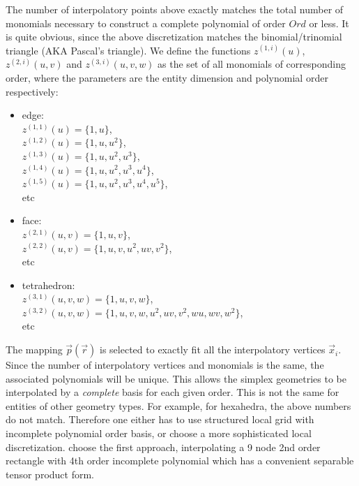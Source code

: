 \noindent
The number of interpolatory points above exactly matches the total number of monomials necessary to construct a complete polynomial of order $Ord$ or less. It is quite obvious, since the above discretization matches the binomial/trinomial triangle (AKA Pascal's triangle). We define the functions $z^{(1,i)}(u)$, $z^{(2,i)}(u,v)$ and $z^{(3,i)}(u,v,w)$ as the set of all monomials of corresponding order, where the parameters are the entity dimension and polynomial order respectively:
\begin{itemize}
	\item edge: \\
		$z^{(1,1)}(u) = \{1, u\}$, \\
		$z^{(1,2)}(u) = \{1, u, u^2\}$, \\
		$z^{(1,3)}(u) = \{1, u, u^2, u^3\}$, \\
		$z^{(1,4)}(u) = \{1, u, u^2, u^3, u^4\}$, \\
		$z^{(1,5)}(u) = \{1, u, u^2, u^3, u^4, u^5\}$, \\
		etc
	\item face:	\\
		$z^{(2,1)}(u,v)	= \{1, u, v\}$, \\
		$z^{(2,2)}(u,v) = \{1, u, v, u^2, uv, v^2\}$, \\
		etc
	\item tetrahedron: \\
		$z^{(3,1)}(u,v,w) = \{1, u, v, w\}$, \\ 
		$z^{(3,2)}(u,v,w) = \{1, u, v, w, u^2, uv, v^2, wu, wv, w^2\}$, \\
		etc
\end{itemize}

\noindent
The mapping $\vec{p}(\vec{r})$ is selected to exactly fit all the interpolatory vertices $\vec{x}_i$. Since the number of interpolatory vertices and monomials is the same, the associated polynomials will be unique. This allows the simplex geometries to be interpolated by a \textit{complete} basis for each given order. This is not the same for entities of other geometry types. For example, for hexahedra, the above numbers do not match. Therefore one either has to use structured local grid with incomplete polynomial order basis, or choose a more sophisticated local discretization. \citeauthor{volakis+2006} choose the first approach, interpolating a 9 node 2nd order rectangle with 4th order incomplete polynomial which has a convenient separable tensor product form. \\

